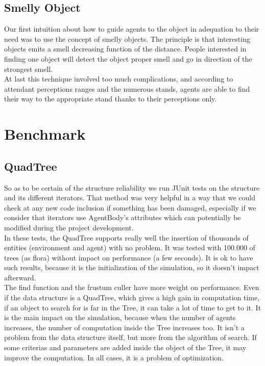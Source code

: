\subsection{Smelly Object}

Our first intuition about how to guide agents to the object in adequation to their need was to use the concept of smelly objects. The principle is that interesting objects emits a smell decreasing function of the distance. People interested in finding one object will detect the object proper smell and go in direction of the strongest smell.\\

At last this technique involved too much complications, and according to attendant perceptions ranges and the numerous stands, agents are able to find their way to the appropriate stand thanks to their perceptions only.

\section{Benchmark}

\subsection{QuadTree}

So as to be certain of the structure reliability we run JUnit tests on the structure and its different iterators. That method was very helpful in a way that we could check at any new code inclusion if something has been damaged, especially if we consider that iterators use AgentBody’s attributes which can potentially be modified during the project development.\\

In these tests, the QuadTree supports really well the insertion of thousands of entities (environment and agent) with no problem. It was tested with 100.000 of trees (as flora) without impact on performance (a few seconds). It is ok to have such results, because it is the initialization of the simulation, so it doesn’t impact afterward.\\

The find function and the frustum culler have more weight on performance. Even if the data structure is a QuadTree, which gives a high gain in computation time, if an object to search for is far in the Tree, it can take a lot of time to get to it. It is the main impact on the simulation, because when the number of agents increases, the number of computation inside the Tree increases too. It isn’t a problem from the data structure itself, but more from the algorithm of search. If some criterias and parameters are added inside the object of the Tree, it may improve the computation. In all cases, it is a problem of optimization.

